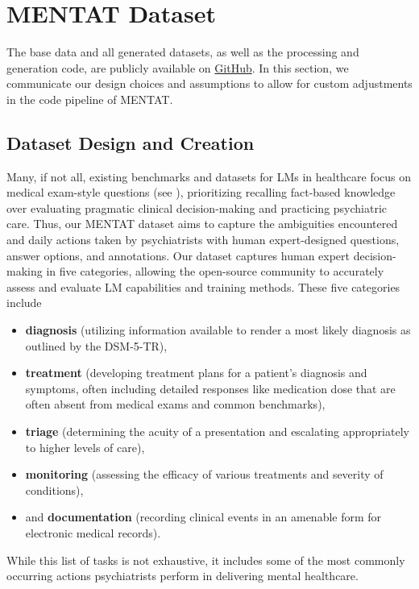 
\section{MENTAT Dataset}
\label{sec:3_dataset}

The base data and all generated datasets, as well as the processing and generation code, are publicly available on \href{https://github.com/maxlampe/mentat}{GitHub}.
In this section, we communicate our design choices and assumptions to allow for custom adjustments in the code pipeline of MENTAT.

\subsection{Dataset Design and Creation}
\label{sec:3_1_datadesign}

Many, if not all, existing benchmarks and datasets for LMs in healthcare focus on medical exam-style questions (see ), prioritizing recalling fact-based knowledge over evaluating pragmatic clinical decision-making and practicing psychiatric care.
Thus, our MENTAT dataset aims to capture the ambiguities encountered and daily actions taken by 
psychiatrists with human expert-designed questions, answer options, and annotations.
Our dataset captures human expert decision-making in five categories, allowing the open-source community to accurately assess and evaluate LM capabilities and training methods.
These five categories include 
\begin{itemize}
    \item \textbf{diagnosis} (utilizing information available to render a most likely diagnosis as outlined by the DSM-5-TR), 
    \item \textbf{treatment} (developing treatment plans for a patient's diagnosis and symptoms, often including detailed responses like medication dose that are often absent from medical exams and common benchmarks), 
    \item \textbf{triage} (determining the acuity of a presentation and escalating appropriately to higher levels of care), 
    \item \textbf{monitoring} (assessing the efficacy of various treatments and severity of conditions), 
    \item and \textbf{documentation} (recording clinical events in an amenable form for electronic medical records).
\end{itemize}
While this list of tasks is not exhaustive, it includes some of the most commonly occurring actions psychiatrists perform in delivering mental healthcare. 

